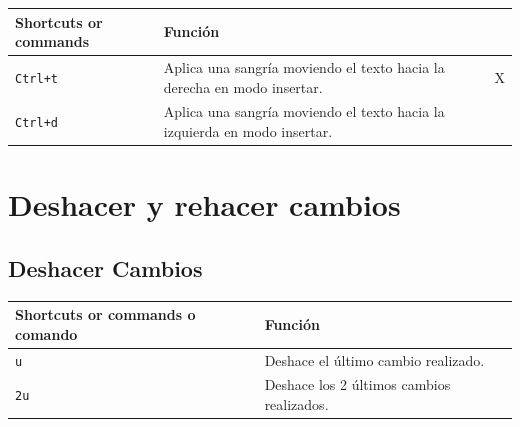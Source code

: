 \documentclass[
  doc,
  floatsintext,
  longtable,
  a4paper,
  nolmodern,
  notxfonts,
  notimes,
  12pt,
  colorlinks=true,linkcolor=blue,citecolor=blue,urlcolor=blue]{apa7}
\newcounter{none} %
\begin{document}
{\def\LTcaptype{none} %
\begin{longtable}[]{@{}
  >{\raggedright\arraybackslash}p{}
  >{\raggedright\arraybackslash}p{}
  >{\raggedright\arraybackslash}p{}@{}}
\toprule\noalign{}
\begin{minipage}[b]{\linewidth}\raggedright
Shortcuts or commands
\end{minipage} & \begin{minipage}[b]{\linewidth}\raggedright
Función
\end{minipage} & \begin{minipage}[b]{\linewidth}\raggedright
\end{minipage} \\
\midrule\noalign{}
\endhead
\bottomrule\noalign{}
\endlastfoot
\texttt{Ctrl+t} & Aplica una sangría moviendo el texto hacia la derecha
en modo insertar. & X \\
\texttt{Ctrl+d} & Aplica una sangría moviendo el texto hacia la
izquierda en modo insertar. & \\
\end{longtable}
}

\section{Deshacer y rehacer cambios}\label{deshacer-y-rehacer-cambios}

\subsection{Deshacer Cambios}\label{deshacer-cambios}

{\def\LTcaptype{none} %
\begin{longtable}[]{@{}
  >{\raggedright\arraybackslash}p{}
  >{\raggedright\arraybackslash}p{}@{}}
\toprule\noalign{}
\begin{minipage}[b]{\linewidth}\raggedright
Shortcuts or commands o comando
\end{minipage} & \begin{minipage}[b]{\linewidth}\raggedright
Función
\end{minipage} \\
\midrule\noalign{}
\endhead
\bottomrule\noalign{}
\endlastfoot
\texttt{u} & Deshace el último cambio realizado. \\
\texttt{2u} & Deshace los 2 últimos cambios realizados. \\
\end{longtable}
}
\end{document}
